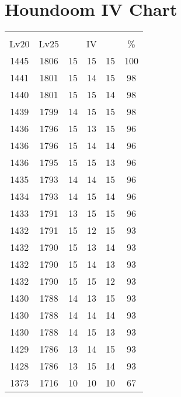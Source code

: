 \documentclass{article}%
\begin{document}
%
\normalsize%
\section{Houndoom IV Chart}%
\label{sec:Houndoom IV Chart}%
\renewcommand{\arraystretch}{1.5}%
\begin{tabular}{|c|c|c|c|c|c|}%
\hline%
\multicolumn{6}{|c|}{\textcolor{white}{ 
\linebreak{Houndoom}
}%
\cellcolor{black}}\\%
\multicolumn{1}{|c}{Lv20}&\multicolumn{1}{c|}{Lv25}&\multicolumn{3}{c|}{IV}&\multicolumn{1}{|c|}{\%}\\%
\hline%
\rowcolor{color100}%
1445&1806&15&15&15&100\\%
\hline%
\rowcolor{color98}%
1441&1801&15&14&15&98\\%
\hline%
\rowcolor{color98}%
1440&1801&15&15&14&98\\%
\hline%
\rowcolor{color98}%
1439&1799&14&15&15&98\\%
\hline%
\rowcolor{color96}%
1436&1796&15&13&15&96\\%
\hline%
\rowcolor{color96}%
1436&1796&15&14&14&96\\%
\hline%
\rowcolor{color96}%
1436&1795&15&15&13&96\\%
\hline%
\rowcolor{color96}%
1435&1793&14&14&15&96\\%
\hline%
\rowcolor{color96}%
1434&1793&14&15&14&96\\%
\hline%
\rowcolor{color96}%
1433&1791&13&15&15&96\\%
\hline%
\rowcolor{color93}%
1432&1791&15&12&15&93\\%
\hline%
\rowcolor{color93}%
1432&1790&15&13&14&93\\%
\hline%
\rowcolor{color93}%
1432&1790&15&14&13&93\\%
\hline%
\rowcolor{color93}%
1432&1790&15&15&12&93\\%
\hline%
\rowcolor{color93}%
1430&1788&14&13&15&93\\%
\hline%
\rowcolor{color93}%
1430&1788&14&14&14&93\\%
\hline%
\rowcolor{color93}%
1430&1788&14&15&13&93\\%
\hline%
\rowcolor{color93}%
1429&1786&13&14&15&93\\%
\hline%
\rowcolor{color93}%
1428&1786&13&15&14&93\\%
\hline%
\rowcolor{color91}%
1373&1716&10&10&10&67\\%
\end{tabular}

%
\end{document}
